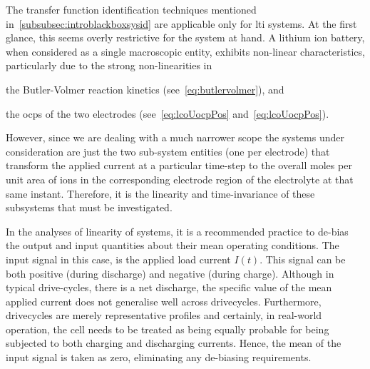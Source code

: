 The      transfer     function      identification     techniques      mentioned
in~\cref{subsubsec:introblackboxsysid}   are  applicable  only   for   \gls{lti}
systems.  At the  first glance,  this seems  overly restrictive  for the  system
at  hand.  A lithium  ion  battery,  when  considered  as a  single  macroscopic
entity,  exhibits non-linear  characteristics,  particularly due  to the  strong
non-linearities in
\begin{enumerate*}[label=\emph{\alph*})]
    \item the Butler-Volmer reaction kinetics (see~\cref{eq:butlervolmer}), and
    \item the \glspl{ocp} of the two electrodes (see~\cref{eq:lcoUocpPos} and~\cref{eq:lcoUocpPos}).
\end{enumerate*}
However, since we are dealing with a much narrower scope \ie{} the systems under
consideration  are just  the two  sub-system entities  (one per  electrode) that
transform the applied current at a particular time-step to the overall moles per
unit  area of    ions  in the  corresponding  electrode  region of  the
electrolyte at that same instant. Therefore, it is the linearity and time-invariance of
these subsystems that must be investigated.

In the analyses of linearity of systems, it is a recommended practice to de-bias
the output and input quantities about their mean operating conditions. The input
signal in this case, is the applied load current $I(t)$. This signal can be both
positive (during  discharge) and negative  (during charge). Although  in typical
drive-cycles, there is  a net discharge, the specific value  of the mean applied
current does  not generalise  well across drivecycles.  Furthermore, drivecycles
are merely representative  profiles and certainly, in  real-world operation, the
cell needs to be  treated as being equally probable for  being subjected to both
charging and discharging currents. Hence, the  mean of the input signal is taken
as zero, eliminating any de-biasing requirements.

